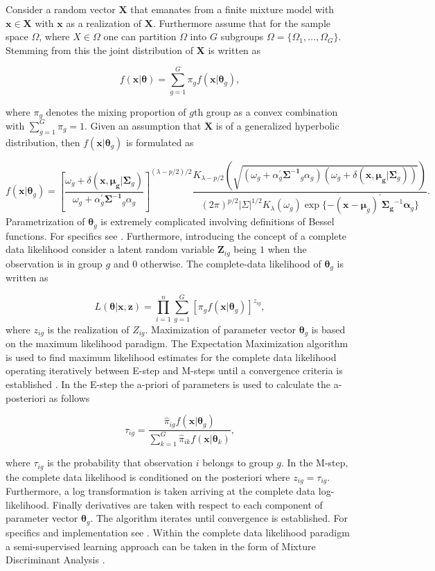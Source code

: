 \documentclass[11pt,letterpaper]{article}
\begin{document}
Consider a random vector $\bm{X}$ that emanates from a finite mixture model with $\bm{x} \in \bm{X}$ with $\bm{x}$ as a realization of $ \bm{X}$. Furthermore assume that for the sample space $\Omega$, where $X \in \Omega$ one can partition $\Omega$ into $G$ subgroups $\Omega = \{\Omega_1, \dots ,\Omega_G \}$. Stemming from this the joint distribution of $\bm{X}$ is written as

$$f(\bm{x}| \bm{\theta}) = \sum_{g = 1}^G \pi_g f(\bm{x}| \bm{\theta}_g), $$

where $\pi_g$ denotes the mixing proportion of $g$th group  as a convex combination with $\sum_{g=1}^G \pi_g = 1$. Given an assumption that $\bm{X}$ is of a generalized hyperbolic distribution, then $f(\bm{x}| \bm{\theta}_g)$ is formulated as 

$$ f (\bm{x}| \bm{\theta}_g) = \left[ \frac{ \omega_g + \delta(  \bm{x}, \bm{\mu_g} | \bm{\Sigma}_g  )     }{ \omega_g +  \alpha^{'}_g \bm{\Sigma^{-1}}_g \alpha_g  }\right]^{(\lambda - p/2)/2} \frac{K_{\lambda - p/2} \left( \sqrt{ (\omega_g +  \alpha^{'}_g \bm{\Sigma^{-1}}_g \alpha_g ) (  \omega_g + \delta(  \bm{x}, \bm{\mu_g} | \bm{\Sigma}_g  ))   }    \right)    }{(2 \pi)^{p/2} |\Sigma|^{1/2} K_\lambda(\omega_g) \exp\{ - ( \bm{x} - \bm{\mu}_g)^{'} \bm{\Sigma_g}^{-1} \bm{\alpha}_g\}  } .   $$ Parametrization of $\bm{\theta}_g$ is extremely complicated involving definitions of Bessel functions. For specifics see \cite{hyper}. Furthermore, introducing the concept of a complete data likelihood consider a latent random variable $\bm{Z}_{ig}$ being $1$ when the observation is in group $g$ and $0$ otherwise. The complete-data likelihood of $\bm{\theta}_g$ is written as 

$$L(\bm{\theta} | \bm{x}, \bm{z}) = \prod_{i=1}^n \sum_{g=1}^G \left[  \pi_g f(\bm{x}| \bm{\theta}_g) \right]^{z_{ig}},  $$
where $z_{ig}$ is the realization of $Z_{ig}$. Maximization of parameter vector $\bm{\theta}_g$ is based on the maximum likelihood paradigm. The Expectation Maximization algorithm  is used to find maximum likelihood estimates for the complete data likelihood operating iteratively between E-step and M-steps until a convergence criteria is established \citep{dempster}. In the E-step the a-priori of parameters is used to calculate the a-posteriori as follows 

$$\tau_{ig} = \frac{\hat{\pi}_{ig}  f(\bm{x}| \bm{\theta}_g)  }{ \sum_{k=1}^G \hat{\pi}_{ik}  f(\bm{x}| \bm{\theta}_k) }, $$

where $\tau_{ig} $ is the probability that observation $i$ belongs to group $g$. In the M-step, the complete data likelihood is conditioned on the posteriori where $z_{ig} = \tau_{ig}$. Furthermore, a log transformation is taken arriving at the complete data log-likelihood. Finally derivatives are taken with respect to each component of parameter vector $\bm{\theta}_g$.  The algorithm iterates until convergence is established. For specifics and implementation see \cite{hyper}. Within the complete data likelihood paradigm a semi-supervised learning approach can be taken in the form of Mixture Discriminant Analysis \citep[see][]{mixdist}. 
\end{document}
